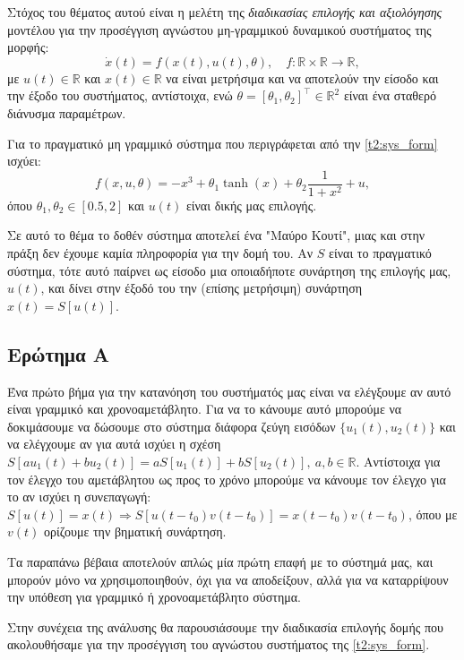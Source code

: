 \documentclass[12pt]{article} %
\numberwithin{equation}{section}  %
\begin{document}
Στόχος του θέματος αυτού είναι η μελέτη της \textit{διαδικασίας επιλογής και αξιολόγησης} μοντέλου 
για την προσέγγιση αγνώστου μη-γραμμικού δυναμικού συστήματος της μορφής:
\begin{equation}\label{t2:sys_form}
    \dot x (t) = f(x(t), u(t), \theta), \quad f: \mathbb{R} \times \mathbb{R} \rightarrow \mathbb{R}, 
\end{equation}
με $u(t) \in \mathbb{R}$ και $x(t)\in \mathbb{R}$ να είναι μετρήσιμα και να αποτελούν την είσοδο και την έξοδο του συστήματος, αντίστοιχα, ενώ
$\theta = [\theta_1, \theta_2]^{\top} \in \mathbb{R}^2$ είναι ένα σταθερό διάνυσμα παραμέτρων. 

Για το πραγματικό μη γραμμικό σύστημα που περιγράφεται από την \eqref{t2:sys_form} ισχύει:
\begin{equation}\label{t2:f_true}
    f(x, u, \theta) = - x^3 + \theta_1 \tanh(x) + \theta_2 \frac{1}{1 + x^2} + u, 
\end{equation}
όπου $\theta_1, \theta_2 \in [0.5, 2]$ και $u(t)$ είναι δικής μας επιλογής. 

Σε αυτό το θέμα το δοθέν σύστημα αποτελεί ένα "Μαύρο Κουτί", μιας και στην πράξη δεν έχουμε καμία πληροφορία για την δομή του. 
Αν $S$ είναι το πραγματικό σύστημα, τότε αυτό παίρνει ως είσοδο μια οποιαδήποτε συνάρτηση της επιλογής μας, $u(t)$, 
και δίνει στην έξοδό του την (επίσης μετρήσιμη) συνάρτηση $x(t) = S[u(t)]$.


\subsection{Ερώτημα Α}
Ένα πρώτο βήμα για την κατανόηση του συστήματός μας είναι να ελέγξουμε αν αυτό είναι γραμμικό και χρονοαμετάβλητο.
Για να το κάνουμε αυτό μπορούμε να δοκιμάσουμε να δώσουμε στο σύστημα διάφορα ζεύγη εισόδων $\{u_1(t), u_2(t)\}$
και να ελέγχουμε αν για αυτά ισχύει η σχέση $S[au_1(t) + bu_2(t)] = aS[u_1(t)] + bS[u_2(t)],\ a,b \in \mathbb{R}$.
Αντίστοιχα για τον έλεγχο του αμετάβλητου ως προς το χρόνο μπορούμε να κάνουμε τον έλεγχο για το αν ισχύει η συνεπαγωγή: 
$S[u(t)] = x(t) \Rightarrow S[u(t - t_0)v(t-t_0)] = x(t-t_0)v(t-t_0)$, όπου με $v(t)$ ορίζουμε την βηματική συνάρτηση. 

Τα παραπάνω βέβαια αποτελούν απλώς μία πρώτη επαφή με το σύστημά μας, και μπορούν μόνο να χρησιμοποιηθούν, όχι για να αποδείξουν, αλλά για να 
καταρρίψουν την υπόθεση για γραμμικό ή χρονοαμετάβλητο σύστημα. 

Στην συνέχεια της ανάλυσης θα παρουσιάσουμε την διαδικασία επιλογής δομής που ακολουθήσαμε για την προσέγγιση του αγνώστου συστήματος της \eqref{t2:sys_form}.
\end{document}

